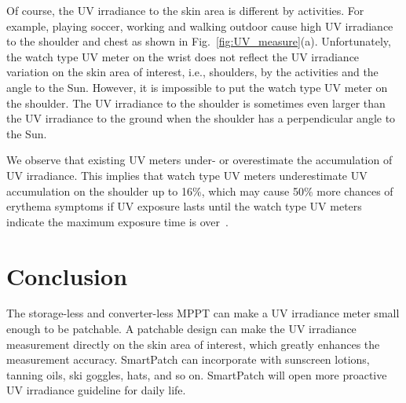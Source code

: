 \documentclass[journal]{IEEEtran}
\begin{document}
Of course, the UV irradiance to the skin area is different by activities.
For example, playing soccer, working and walking outdoor cause high UV irradiance to the shoulder and chest as shown in Fig.~\ref{fig:UV_measure}(a).
Unfortunately, the watch type UV meter on the wrist does not reflect the UV irradiance variation on the skin area of interest, i.e., shoulders, by the activities and the angle to the Sun.
However, it is impossible to put the watch type UV meter on the shoulder.
The UV irradiance to the shoulder is sometimes even larger than the UV irradiance to the ground when the shoulder has a perpendicular angle to the Sun.

We observe that existing UV meters under- or overestimate the accumulation of UV irradiance.
This implies that watch type UV meters underestimate UV accumulation on the shoulder up to 16\%, which may cause 50\% more chances of erythema symptoms if UV exposure lasts until the watch type UV meters indicate the maximum exposure time is over~\cite{Harrison:Method02}.

\section{Conclusion}

The storage-less and converter-less MPPT can make a UV irradiance meter small enough to be patchable.
A patchable design can make the UV irradiance measurement directly on the skin area of interest, which greatly enhances the measurement accuracy.
SmartPatch can incorporate with sunscreen lotions, tanning oils, ski goggles, hats, and so on.
SmartPatch will open more proactive UV irradiance guideline for daily life.








%
%

\end{document}
